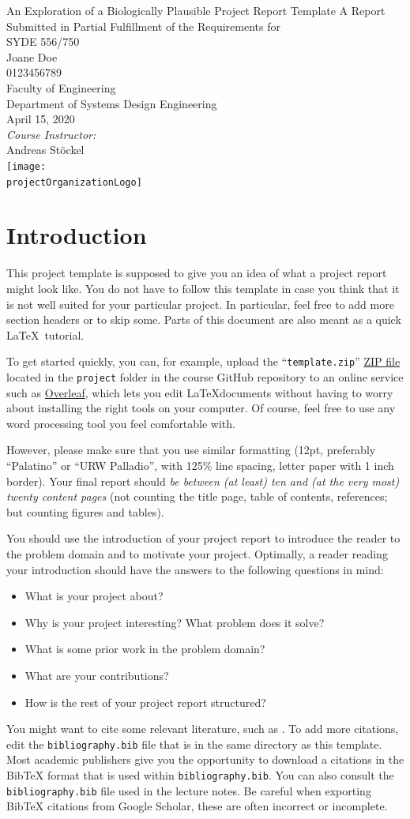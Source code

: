 \documentclass[12pt,letterpaper,oneside]{article}
\newcommand{\MakeTitle}{%
	{%
		\thispagestyle{empty}
		\centering
		{\huge \projectName}
		\vfill
		{\large A Report Submitted in Partial Fulfillment of the Requirements for\\ \projectCourse}\\[1cm]
		{\large \projectStudentName}\\
		{\projectStudentID} \\[1cm]
		{\large \projectStudentFaculty}\\
		{\large \projectStudentDepartment}\\
		\vfill
		{\large \projectDate}\\[1cm]
		\emph{Course Instructor:}\\
		\projectCourseInstructor\\
		\vfill
		\texttt{[image: \\projectOrganizationLogo]}
		\setcounter{page}{0}
		\newpage%
	}%
	{%
		\pagenumbering{roman}
		\setcounter{tocdepth}{2}
		\tableofcontents
		\newpage
		
		\setcounter{page}{0}
		\pagenumbering{arabic}
	}
}
\newcommand{\projectCourse}%
	{SYDE 556/750}
\newcommand{\projectCourseInstructor}%
	{Andreas Stöckel}
\newcommand{\projectOrganizationLogo}%
	{assets/uwlogo.pdf}
\newcommand{\projectName}%
	{An Exploration of a Biologically Plausible Project Report Template}
\newcommand{\projectStudentName}%
	{Joane Doe}
\newcommand{\projectStudentID}%
	{0123456789}
\newcommand{\projectStudentFaculty}%
	{Faculty of Engineering}
\newcommand{\projectStudentDepartment}%
	{Department of Systems Design Engineering}
\newcommand{\projectDate}%
	{April 15, 2020}
\begin{document}
	\MakeTitle

	\section{Introduction}
	\label{sec:introduction}

	This project template is supposed to give you an idea of what a project report might look like. You do not have to follow this template in case you think that it is not well suited for your particular project. In particular, feel free to add more section headers or to skip some. Parts of this document are also meant as a quick \LaTeX\ tutorial.

	To get started quickly, you can, for example, upload the \enquote{\texttt{template.zip}} \href{https://github.com/astoeckel/syde556-w20/raw/master/project/template.zip}{ZIP file} located in the \texttt{project} folder in the course GitHub repository to an online service such as \href{https://www.overleaf.com/}{Overleaf}, which lets you edit \LaTeX documents without having to worry about installing the right tools on your computer. Of course, feel free to use any word processing tool you feel comfortable with.

	However, please make sure that you use similar formatting (12pt, preferably \enquote{Palatino} or \enquote{URW Palladio}, with 125\% line spacing, letter paper with 1 inch border). Your final report should \emph{be between (at least) ten and (at the very most) twenty content pages} (not counting the title page, table of contents, references; but counting figures and tables).

	You should use the introduction of your project report to introduce the reader to the problem domain and to motivate your project. Optimally, a reader reading your introduction should have the answers to the following questions in mind:
	\begin{itemize}
		\item What is your project about?
		\item Why is your project interesting? What problem does it solve?
		\item What is some prior work in the problem domain?
		\item What are your contributions?
		\item How is the rest of your project report structured?
	\end{itemize}

 	You might want to cite some relevant literature, such as \cite{eliasmith2003neural,eliasmith2013how}. To add more citations, edit the \texttt{bibliography.bib} file that is in the same directory as this template. Most academic publishers give you the opportunity to download a citations in the BibTeX format that is used within \texttt{bibliography.bib}. You can also consult the \texttt{bibliography.bib} file used in the lecture notes. Be careful when exporting BibTeX citations from Google Scholar, these are often incorrect or incomplete.
 	
\end{document}
